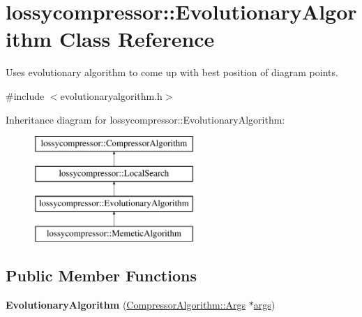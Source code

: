 \hypertarget{classlossycompressor_1_1_evolutionary_algorithm}{}\section{lossycompressor\+:\+:Evolutionary\+Algorithm Class Reference}
\label{classlossycompressor_1_1_evolutionary_algorithm}


Uses evolutionary algorithm to come up with best position of diagram points.  




{\ttfamily \#include $<$evolutionaryalgorithm.\+h$>$}

Inheritance diagram for lossycompressor\+:\+:Evolutionary\+Algorithm\+:\begin{figure}[H]
\begin{center}
\leavevmode
\includegraphics[height=4.000000cm]{classlossycompressor_1_1_evolutionary_algorithm}
\end{center}
\end{figure}
\subsection*{Public Member Functions}
\begin{DoxyCompactItemize}
\item 
{\bfseries Evolutionary\+Algorithm} (\hyperlink{structlossycompressor_1_1_compressor_algorithm_1_1_args}{Compressor\+Algorithm\+::\+Args} $\ast$\hyperlink{classlossycompressor_1_1_compressor_algorithm_a7cec23bc2a41ac35617e21466a2f0c46}{args})\hypertarget{classlossycompressor_1_1_evolutionary_algorithm_a145e42ac3f5b468dace534257e24196a}{}\label{classlossycompressor_1_1_evolutionary_algorithm_a145e42ac3f5b468dace534257e24196a}

\end{DoxyCompactItemize}
